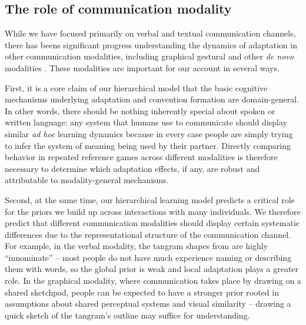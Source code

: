 \subsection{The role of communication modality}


While we have focused primarily on verbal and textual communication channels, there has beens significant progress understanding the dynamics of adaptation in other communication modalities, including graphical \cite{GarrodFayLeeOberlanderMacLeod07_GraphicalSymbolSystems,TheisenEtAl10_SystematicityArbitrariness,hawkins2019disentangling} gestural \cite{FayListerEllisonGoldinMeadow13_GestureBeatsVocalization,motamedi2019evolving,bohn2019young} and other \emph{de novo} modalities \cite{Galantucci05_EmergenceOfCommunication,RobertsGalantucci12_DualityOfPatterning,RobertsEtAl15_IconocityOnCombinatoriality,VerhoefRobertsDingemanse15_Iconicity,VerhoefEtAl16_TemporalLanguage,kempe2019adults}.
These modalities are important for our account in several ways.

First, it is a core claim of our hierarchical model that the basic cognitive mechanisms underlying adaptation and convention formation are domain-general.
In other words, there should be nothing inherently special about spoken or written language: any system that humans use to communicate should display similar \emph{ad hoc} learning dynamics because in every case people are simply trying to infer the system of meaning being used by their partner.
Directly comparing behavior in repeated reference games across different modalities is therefore necessary to determine which adaptation effects, if any, are robust and attributable to modality-general mechanisms.

Second, at the same time, our hierarchical learning model predicts a critical role for the priors we build up across interactions with many individuals.
We therefore predict that different communication modalities should display certain systematic differences due to the representational structure of the communication channel.
For example, in the verbal modality, the tangram shapes from  are highly ``innominate'' -- most people do not have much experience naming or describing them with words, so the global prior is weak and local adaptation plays a greater role.
In the graphical modality, where communication takes place by drawing on a shared sketchpad, people can be expected to have a stronger prior rooted in assumptions about shared perceptual systems and visual similarity \cite{fan2018common} -- drawing a quick sketch of the tangram's outline may suffice for understanding.

